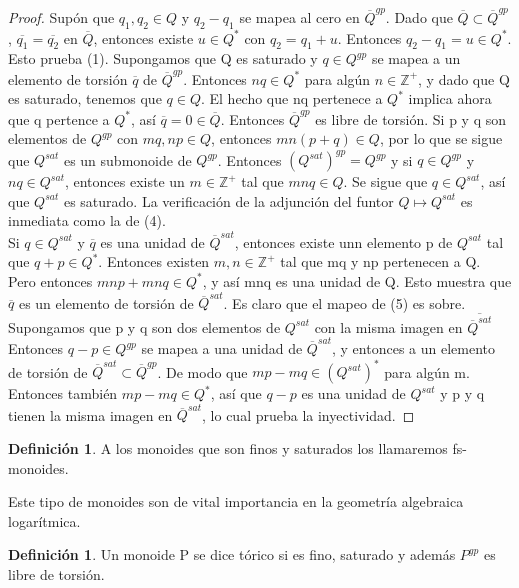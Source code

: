 \documentclass[12pt,spanish]{amsart}
\newcommand{\bb}[1]{\mathbb{#1}}
\theoremstyle{definition}
\newtheorem{Def}[Theorem]{Definición}
\theoremstyle{remark}
\begin{document}
\begin{proof}
Supón que $q_{1},q_{2}\in Q$ y $q_{2}-q_{1}$ se mapea al cero en $\overline{Q}^{gp}$. Dado que $\overline{Q} \subset \overline{Q}^{gp}$, $\overline{q_{1}}=\overline{q_{2}}$ en $\overline{Q}$, entonces existe $u\in Q^{\ast}$ con $q_{2}=q_{1}+u$. Entonces $q_{2}-q_{1}=u\in Q^{\ast}$. Esto prueba (1). Supongamos que Q es saturado y $q\in Q^{gp}$ se mapea a un elemento de torsión $\overline{q}$ de $\overline{Q}^{gp}$. Entonces $nq\in Q^{\ast}$ para algún $n\in \bb{Z}^{+}$, y dado que Q es saturado, tenemos que $q\in Q$.  El hecho que nq pertenece a $Q^{\ast}$ implica ahora que q pertence a $Q^{\ast}$, así $\overline{q}=0\in \overline{Q}$. Entonces $\overline{Q}^{gp}$ es libre de torsión. Si p y q son elementos de $Q^{gp}$ con $mq,np\in Q$, entonces $mn(p+q)\in Q$, por lo que se sigue que $Q^{sat}$ es un submonoide de $Q^{gp}$. Entonces $(Q^{sat})^{gp}=Q^{gp}$ y si $q\in Q^{gp}$ y $nq\in Q^{sat}$, entonces existe un $m\in \bb{Z}^{+}$ tal que $mnq\in Q$. Se sigue que $q\in Q^{sat}$, así que $Q^{sat}$ es saturado. La verificación de la adjunción del funtor $Q \mapsto Q^{sat}$ es inmediata como la de (4). \\
Si $q\in Q^{sat}$ y $\overline{q}$ es una unidad de $\overline{Q}^{sat}$, entonces existe unn elemento p de $Q^{sat}$ tal que $q+p\in Q^{\ast}$. Entonces existen $m,n\in \bb{Z}^{+}$ tal que mq y np pertenecen a Q. Pero entonces $mnp+mnq\in Q^{\ast}$, y así mnq es una unidad de Q. Esto muestra que $\overline{q}$ es un elemento de torsión de $\overline{Q}^{sat}$. Es claro que el mapeo de (5) es sobre. \\
Supongamos que p y q son dos elementos de $Q^{sat}$ con la misma imagen en $\overline{\overline{Q}^{sat}}$ Entonces $q-p\in Q^{gp}$ se mapea a una unidad de $\overline{Q}^{sat}$, y entonces a un elemento de torsión de $\overline{Q}^{sat} \subset \overline{Q}^{gp}$. De modo que $mp-mq\in (Q^{sat})^{\ast}$  para algún m. Entonces también $mp-mq\in Q^{\ast}$, así que $q-p$ es una unidad de $Q^{sat}$ y p y q tienen la misma imagen en $\overline{Q}^{sat}$, lo cual prueba la inyectividad.    
\end{proof}

\begin{Def}
A los monoides que son finos y saturados los llamaremos fs-monoides.
\end{Def}

Este tipo de monoides son de vital importancia en la geometría algebraica logarítmica. 

\begin{Def}
Un monoide P se dice tórico si es fino, saturado y además $P^{gp}$ es libre de torsión. 
\end{Def}
\end{document}
